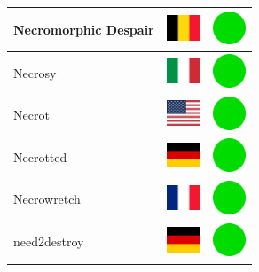 \documentclass[12pt, a4paper, twoside]{report}
\begin{document}
\begin{center}
\begin{longtable}{|p{5cm}|p{2cm}|p{2cm}|}
 Necromorphic Despair                                       & \includegraphics[width=1cm]{../4x3/be} &   \includegraphics[width=1cm]{../likes/y} \\ \hline
 Necrosy                                                    & \includegraphics[width=1cm]{../4x3/it} &   \includegraphics[width=1cm]{../likes/y} \\ \hline
 Necrot                                                     & \includegraphics[width=1cm]{../4x3/us} &   \includegraphics[width=1cm]{../likes/y} \\ \hline
 Necrotted                                                  & \includegraphics[width=1cm]{../4x3/de} &   \includegraphics[width=1cm]{../likes/y} \\ \hline
 Necrowretch                                                & \includegraphics[width=1cm]{../4x3/fr} &   \includegraphics[width=1cm]{../likes/y} \\ \hline
 need2destroy                                               & \includegraphics[width=1cm]{../4x3/de} &   \includegraphics[width=1cm]{../likes/y} \\ \hline

\end{longtable}
\end{center}
\end{document}
